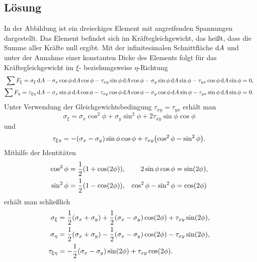 \documentclass{exercise}
\begin{document}
    \subsection*{Lösung}
    In der Abbildung ist ein dreieckiges Element mit angreifenden Spannungen dargestellt.
    Das Element befindet sich im Kräftegleichgewicht, das heißt, dass die Summe aller Kräfte null ergibt.
    Mit der infinitesimalen Schnittfläche \(\mathop{\mathrm{d}\!} A\) und unter der Annahme einer konstanten Dicke des Elements folgt für das Kräftegleichgewicht im \(\xi\)- beziehungsweise \(\eta\)-Richtung
    \begin{align*}
        \sum F_\xi = \sigma_\xi\d A - \sigma_x\cos\phi\d A\cos\phi - \tau_{xy}\sin\phi\d A\cos\phi - \sigma_y\sin\phi\d A\sin\phi - \tau_{yx}\cos\phi\d A\sin\phi &= 0,\\
        \sum F_\eta = \tau_{\xi\eta}\d A - \sigma_x\sin\phi\d A\cos\phi - \tau_{xy}\cos\phi\d A\cos\phi - \sigma_y\cos\phi\d A\sin\phi - \tau_{yx}\sin\phi\d A\sin\phi &= 0.
    \end{align*}
    Unter Verwendung der Gleichgewichtsbedingung \(\tau_{xy} = \tau_{yx}\) erhält man
    \[
        \sigma_\xi = \sigma_x\cos^2\phi + \sigma_y\sin^2\phi + 2\tau_{xy}\sin\phi\cos\phi
    \]
    und
    \[
        \tau_{\xi\eta} = -\parentheses*{\sigma_x - \sigma_y}\sin\phi\cos\phi + \tau_{xy}\parentheses*{\cos^2\phi - \sin^2\phi}.
    \]
    Mithilfe der Identitäten
    \begin{align*}
        \cos^2\phi &= \frac{1}{2}\parentheses*{1 + \cos\parentheses*{2\phi}}, & 2\sin\phi\cos\phi &= \sin\parentheses*{2\phi},\\
        \sin^2\phi &= \frac{1}{2}\parentheses*{1 - \cos\parentheses*{2\phi}}, & \cos^2\phi - \sin^2\phi &= \cos\parentheses*{2\phi}
    \end{align*}
    erhält man schließlich
    \begin{align*}
        \sigma_\xi &= \frac{1}{2}\parentheses*{\sigma_x + \sigma_y} + \frac{1}{2}\parentheses*{\sigma_x - \sigma_y}\cos\parentheses*{2\phi} + \tau_{xy}\sin\parentheses*{2\phi},\\
        \sigma_\eta &= \frac{1}{2}\parentheses*{\sigma_x + \sigma_y} - \frac{1}{2}\parentheses*{\sigma_x - \sigma_y}\cos\parentheses*{2\phi} - \tau_{xy}\sin\parentheses*{2\phi},\\
        \tau_{\xi\eta} &= -\frac{1}{2}\parentheses*{\sigma_x - \sigma_y}\sin\parentheses*{2\phi} + \tau_{xy}\cos\parentheses*{2\phi}.
    \end{align*}
\end{document}
